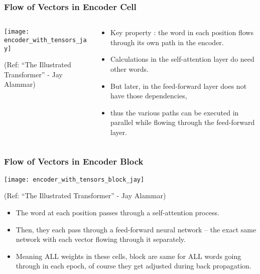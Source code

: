 \begin{frame}[fragile]\frametitle{Flow of Vectors in Encoder Cell}


\begin{columns}
    \begin{column}[T]{0.5\linewidth}
\begin{center}
\texttt{[image: encoder\_with\_tensors\_jay]}


{\tiny (Ref: ``The Illustrated Transformer'' - Jay Alammar)}
\end{center}		

		\end{column}
    \begin{column}[T]{0.5\linewidth}
\begin{itemize}
\item Key property : the word in each position flows through its own path in the encoder. 
\item Calculations in the self-attention layer do need other words. 
\item But later, in the feed-forward layer does not have those dependencies, \item thus the various paths can be executed in parallel while flowing through the feed-forward layer.
\end{itemize}
    \end{column}
  \end{columns}
\end{frame}

\begin{frame}[fragile]\frametitle{Flow of Vectors in Encoder Block}


\begin{center}
\texttt{[image: encoder\_with\_tensors\_block\_jay]}


{\tiny (Ref: ``The Illustrated Transformer'' - Jay Alammar)}
\end{center}		


\begin{itemize}
\item The word at each position passes through a self-attention process. 
\item Then, they each pass through a feed-forward neural network -- the exact same network with each vector flowing through it separately.
\item Meaning ALL weights in these cells, block are same for ALL words going through in each epoch, of course they get adjusted during back propagation.
\end{itemize}

\end{frame}


